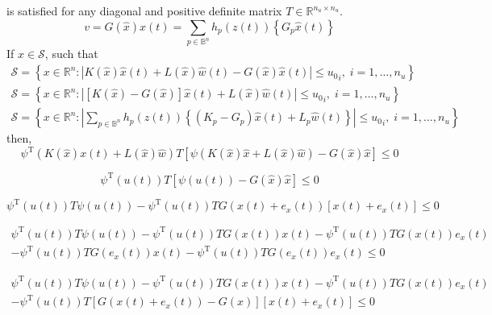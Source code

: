is satisfied for any diagonal and positive definite matrix \( T \in \mathbb{R}^{n_u \times n_u} \).
\begin{equation}
  v = G(\hat x) x(t) = \sum\limits_{p\in \mathbb{B}^n} h_p(z(t))\left\{G_p \hat x(t)\right\}
\end{equation}
If $x \in \mathcal{S}$, such that
\begin{gather}
  \mathcal{S} = \left\{ x \in \mathbb{R}^{n} : | K(\hat x) \hat x(t) + L(\hat x) \hat w(t) - G(\hat x) \hat x(t)| \leq {u_0}_i,\; i = 1, \dots, n_u \right\} \\
  \mathcal{S} = \left\{ x \in \mathbb{R}^{n} : | \left[K(\hat x) - G(\hat x)\right] \hat x(t) + L(\hat x) \hat w(t)| \leq {u_0}_i,\; i = 1, \dots, n_u \right\} \\
  \mathcal{S} = \left\{ x \in \mathbb{R}^{n} : \left| \sum\limits_{p\in \mathbb{B}^n} h_p(z(t))\left\{(K_p - G_p) \hat x(t) + L_p \hat w(t) \right\}\right| \leq {u_0}_i,\; i = 1, \dots, n_u \right\}
\end{gather}
then,
\begin{equation}
  \psi^\text{T}(K(\hat x) x(t) + L(\hat x) \hat w) T\left[\psi(K(\hat x) \hat x + L(\hat x) \hat w) - G(\hat x) \hat x\right] \leq 0
\end{equation}

\begin{equation}
  \psi^\text{T}(u(t)) T\left[\psi(u(t)) - G(\hat x) \hat x\right] \leq 0
\end{equation}

\begin{equation}
  \psi^\text{T}(u(t)) T \psi(u(t)) - \psi^\text{T}(u(t)) T G(x(t) + e_x(t)) \left[x(t) + e_x(t)\right] \leq 0
\end{equation}

\begin{multline}
  \psi^\text{T}(u(t)) T \psi(u(t)) - \psi^\text{T}(u(t)) T G(x(t)) x(t) - \psi^\text{T}(u(t)) T G(x(t)) e_x(t) \\- \psi^\text{T}(u(t)) T G(e_x(t)) x(t) - \psi^\text{T}(u(t)) T G(e_x(t)) e_x(t)\leq 0
\end{multline}

\begin{multline}
  \psi^\text{T}(u(t)) T \psi(u(t)) - \psi^\text{T}(u(t)) T G(x(t)) x(t) - \psi^\text{T}(u(t)) T G(x(t)) e_x(t) \\- \psi^\text{T}(u(t)) T \left[G(x(t) + e_x(t)) - G(x)\right] \left[x(t) + e_x(t)\right]\leq 0
\end{multline}

